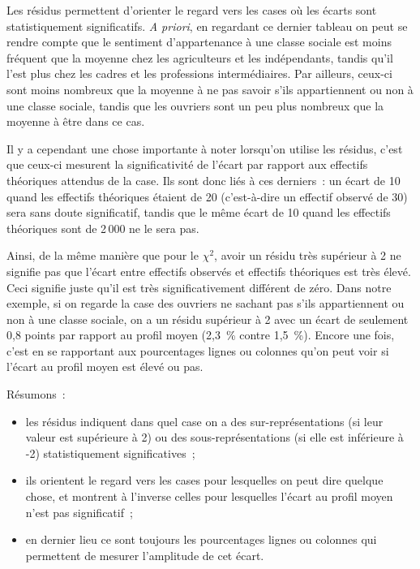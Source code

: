 \documentclass[a4paper,10pt,twoside,francais]{report}
\newcommand{\chid}{$\chi^2$\xspace}
\begin{document}
Les résidus permettent \og d'orienter le regard \fg{} vers les cases où
les écarts sont statistiquement significatifs. \textit{A priori}, en
regardant ce dernier tableau on peut se rendre compte que le sentiment
d'appartenance à une classe sociale est moins fréquent que la moyenne
chez les agriculteurs et les indépendants, tandis qu'il l'est plus
chez les cadres et les professions intermédiaires. Par ailleurs,
ceux-ci sont moins nombreux que la moyenne à ne pas savoir s'ils
appartiennent ou non à une classe sociale, tandis que les ouvriers
sont un peu plus nombreux que la moyenne à être dans ce cas.

Il y a cependant une chose importante à noter lorsqu'on utilise les
résidus, c'est que ceux-ci mesurent la significativité de l'écart
par rapport aux effectifs théoriques attendus de la case. Ils sont
donc liés à ces derniers~: un écart de 10 quand les effectifs
théoriques étaient de 20 (c'est-à-dire un effectif observé de 30) sera
sans doute significatif, tandis que le même écart de 10 quand les
effectifs théoriques sont de 2\,000 ne le sera pas.

Ainsi, de la même manière que pour le \chid, avoir un résidu très
supérieur à 2 ne signifie pas que l'écart entre effectifs observés et
effectifs théoriques est très élevé. Ceci signifie juste qu'il est
très significativement différent de zéro. Dans notre exemple, si on
regarde la case des ouvriers ne sachant pas s'ils appartiennent ou non
à une classe sociale, on a un résidu supérieur à 2 avec un écart de
\og seulement \fg{} 0,8 points par rapport au profil moyen (2,3~\%
contre 1,5~\%). Encore une fois, c'est en se rapportant aux
pourcentages lignes ou colonnes qu'on peut voir si l'écart au profil
moyen est élevé ou pas.

Résumons~:

\begin{itemize}
\item les résidus indiquent dans quel case on a des
  sur-représentations (si leur valeur est supérieure à 2) ou des
  sous-représentations (si elle est inférieure à -2) statistiquement
  significatives~;
\item ils orientent le regard vers les cases pour lesquelles on peut
  dire quelque chose, et montrent à l'inverse celles pour lesquelles
  l'écart au profil moyen n'est pas significatif~;
\item en dernier lieu ce sont toujours les pourcentages lignes ou
  colonnes qui permettent de mesurer l'amplitude de cet écart.
\end{itemize}
\end{document}
